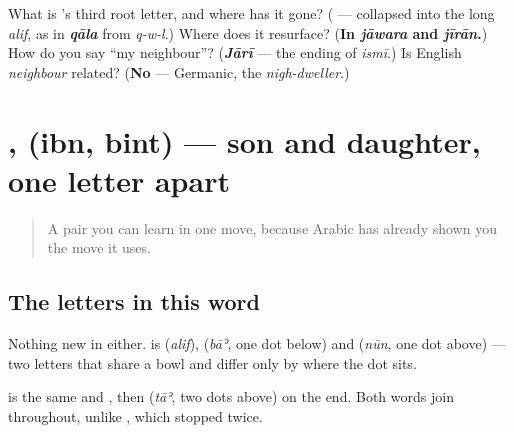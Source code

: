 \begin{tcolorbox}[breakable,colback=teal!4,colframe=teal!35!black,title={Before you move on}]
What is \textbf{}'s third root letter, and where has it gone? (\textbf{} — collapsed into the long \emph{alif}, as in \emph{\textbf{qāla}} from \emph{q-w-l}.) Where does it resurface? (\textbf{In \emph{jāwara} and \emph{jīrān}.}) How do you say \textquotedblleft{}my neighbour\textquotedblright{}? (\emph{\textbf{Jārī}} — the ending of \emph{ismī}.) Is English \emph{neighbour} related? (\textbf{No} — Germanic, the \emph{nigh-dweller}.)
\end{tcolorbox}
\section[\texorpdfstring{\ar{ابن} \ar{بنت} (ibn, bint)}{ابن بنت (ibn, bint)}]{,  (ibn, bint) — son and daughter, one letter apart}

\label{lesson:AR-C35-ibn-bint}



\begin{quote}
A pair you can learn in one move, because Arabic has already shown you the move it uses.
\end{quote}

\subsection*{The letters in this word}
Nothing new in either. \textbf{} is \textbf{} (\emph{alif}), \textbf{} (\emph{bāʾ}, one dot below) and \textbf{} (\emph{nūn}, one dot above) — two letters that share a bowl and differ only by where the dot sits.

\textbf{} is the same \textbf{} and \textbf{}, then \textbf{} (\emph{tāʾ}, two dots above) on the end. Both words join throughout, unlike \textbf{}, which stopped twice.


